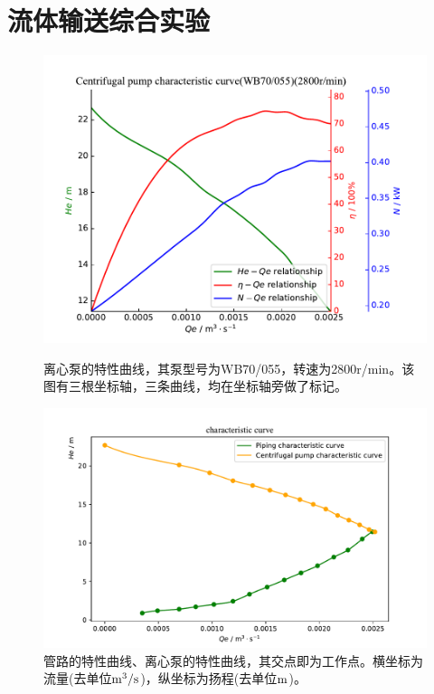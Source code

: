 \documentclass[UTF8,AutoFakeBold,a4paper]{article}
\begin{document}
\section{流体输送综合实验}
\begin{figure}[h]
	\centering
	\includegraphics[scale=0.6]{离心泵特性曲线}
	\caption{离心泵的特性曲线，其泵型号为WB70/055，转速为2800r/min。该图有三根坐标轴，三条曲线，均在坐标轴旁做了标记。}
	
	\centering
	\includegraphics[scale=0.6]{管路特性曲线}
	\caption{管路的特性曲线、离心泵的特性曲线，其交点即为工作点。横坐标为流量(去单位$\rm{m}^{3}/\rm{s}$)，纵坐标为扬程(去单位$\rm{m}$)。}
	
\end{figure}
\end{document}
